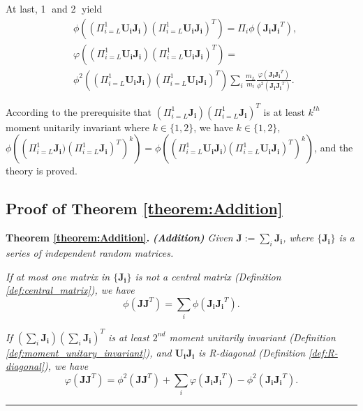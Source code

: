\documentclass[10pt,journal,compsoc]{IEEEtran}
\begin{document}
At last, \textcircled{1} and \textcircled{2} yield
\begin{equation}
\begin{split}
    & \phi\left((\Pi_{i=L}^1\mathbf{U_iJ_i})(\Pi_{i=L}^1\mathbf{U_iJ_i})^T\right) = \Pi_{i}\phi(\mathbf{J_iJ_i}^T),\\
    & \varphi((\Pi_{i=L}^1\mathbf{U_iJ_i})(\Pi_{i=L}^1\mathbf{U_iJ_i})^T)=\\
    & \phi^2\left((\Pi_{i=L}^1\mathbf{U_iJ_i})(\Pi_{i=L}^1\mathbf{U_iJ_i})^T\right) \sum_{i}\frac{m_{L}}{m_{i}}\frac{\varphi(\mathbf{J_iJ_i}^T)}{\phi^2(\mathbf{J_iJ_i}^T)}.
\end{split}
\end{equation}

According to the prerequisite that $(\Pi_{i=L}^1\mathbf{J_i})(\Pi_{i=L}^1\mathbf{J_i})^T$ is at least $k^{th}$ moment unitarily invariant where $k\in\{1,2\}$, we have $k\in\{1, 2\}$, $\phi\left(\left(\Pi_{i=L}^1\mathbf{J_i})(\Pi_{i=L}^1\mathbf{J_i})^T\right)^k\right)=\phi\left(\left(\Pi_{i=L}^1\mathbf{U_iJ_i})(\Pi_{i=L}^1\mathbf{U_iJ_i})^T\right)^k\right)$, and the theory is proved.


 \subsection{Proof of Theorem \ref{theorem:Addition}}\label{proof:addition}

\textbf{Theorem \ref{theorem:Addition}. }\textit{\textbf{(Addition)} Given $\mathbf{J} := \sum_{i}\mathbf{J_i}$, where $\{\mathbf{J_i}\}$ is a series of independent random matrices.}

\textit{If at most one matrix in $\{\mathbf{J_i}\}$ is not a central matrix (Definition \ref{def:central_matrix}), we have}
\begin{equation}
    \phi\left(\mathbf{JJ}^T\right)=\sum_i \phi\left(\mathbf{J_iJ_i}^T\right).
\label{equ:prof:addtion_exp}
\end{equation}

\textit{If $(\sum_{i}\mathbf{J_i})(\sum_{i}\mathbf{J_i})^T$ is at least $2^{nd}$ moment unitarily invariant (Definition \ref{def:moment_unitary_invariant}), and $\mathbf{U_iJ_i}$ is R-diagonal (Definition \ref{def:R-diagonal}), we have}
\begin{equation}
    \varphi\left(\mathbf{JJ}^T\right) = \phi^2\left(\mathbf{JJ}^T\right) + \sum_i \varphi\left(\mathbf{J_iJ_i}^T\right) - \phi^2\left(\mathbf{J_iJ_i}^T\right).
\label{equ:prof:addtion_var}
\end{equation}
\rule[0pt]{0.48\textwidth}{0.05em}
\end{document}
